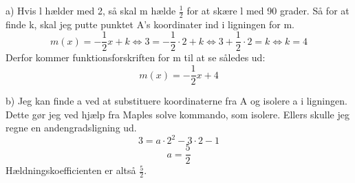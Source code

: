 a)
Hvis l hælder med 2, så skal m hælde $\frac{1}{2}$ for at skære l med 90 grader. Så for at finde k, skal jeg putte punktet A's koordinater ind i ligningen for m.
$$m(x)=-\frac{1}{2}x+k\Longleftrightarrow 3=-\frac{1}{2}\cdot 2+k \Longleftrightarrow 3+\frac{1}{2}\cdot 2 = k \Longleftrightarrow k = 4$$
Derfor kommer funktionsforskriften for m til at se således ud:
$$m(x)=-\frac{1}{2}x+4$$

b)
Jeg kan finde a ved at substituere koordinaterne fra A og isolere a i ligningen. Dette gør jeg ved hjælp fra Maples solve kommando, som isolere. Ellers skulle jeg regne en andengradsligning ud.
$$3=a\cdot 2^2 - 3\cdot 2 - 1$$
$$a = \frac{5}{2}$$
Hældningskoefficienten er altså $\frac{5}{2}$.\newpage

